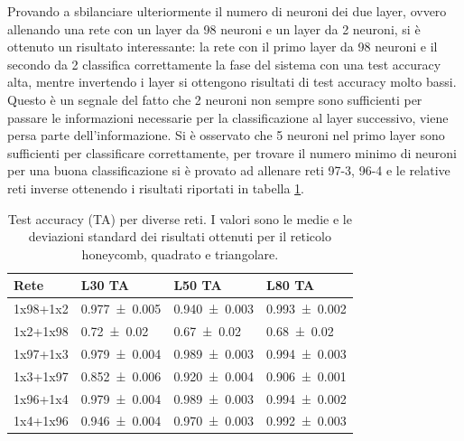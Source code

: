 \documentclass{article}
\begin{document}
Provando a sbilanciare ulteriormente il numero di neuroni dei due layer, ovvero allenando una rete con un layer da 98 neuroni e un layer da 2 neuroni, si è ottenuto un risultato interessante: la rete con il primo layer da 98 neuroni e il secondo da 2 classifica correttamente la fase del sistema con una test accuracy alta, mentre invertendo i layer si ottengono risultati di test accuracy molto bassi.
Questo è un segnale del fatto che 2 neuroni non sempre sono sufficienti per passare le informazioni necessarie per la classificazione al layer successivo, viene persa parte dell'informazione.
Si è osservato che 5 neuroni nel primo layer sono sufficienti per classificare correttamente, per trovare il numero minimo di neuroni per una buona classificazione si è provato ad allenare reti 97-3, 96-4 e le relative reti inverse ottenendo i risultati riportati in tabella \ref{tab:2LN2-3-4}.

\begin{table}[ht]
\begin{center}
\begin{tabular}{llll}
\toprule
Rete & L30 TA & L50 TA & L80 TA \\
\midrule
1x98+1x2 & \num{0.977 \pm 0.005} & \num{0.940 \pm 0.003} & \num{0.993 \pm 0.002}\\
1x2+1x98 & \num{0.72 \pm 0.02} & \num{0.67\pm 0.02} & \num{0.68 \pm 0.02}\\
\midrule
1x97+1x3 & \num{0.979 \pm 0.004} & \num{0.989 \pm 0.003} & \num{0.994 \pm 0.003}\\
1x3+1x97 & \num{0.852 \pm 0.006} & \num{0.920 \pm 0.004} & \num{0.906 \pm 0.001}\\
\midrule
1x96+1x4 & \num{0.979 \pm 0.004} & \num{0.989 \pm 0.003} & \num{0.994 \pm 0.002}\\
1x4+1x96 & \num{0.946 \pm 0.004} & \num{0.970 \pm 0.003} & \num{0.992 \pm 0.003}\\
\bottomrule
\end{tabular}
\end{center}
\caption{Test accuracy (TA) per diverse reti. I valori sono le medie e le deviazioni standard dei risultati ottenuti per il reticolo honeycomb, quadrato e triangolare.}
\label{tab:2LN2-3-4}
\end{table}
\end{document}
